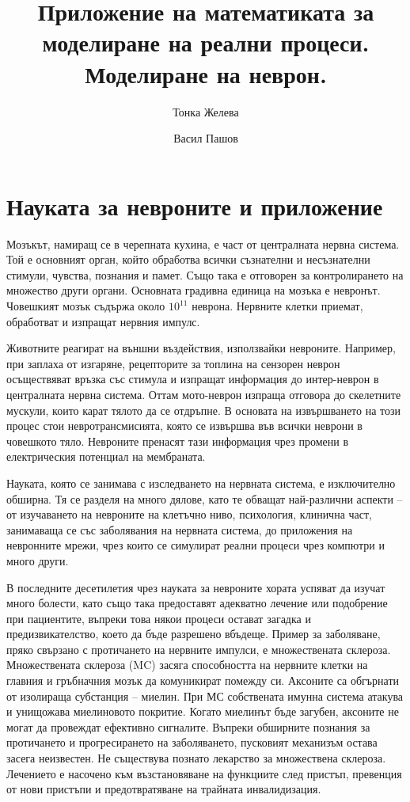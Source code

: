 \documentclass{article}
\title{Приложение на математиката за моделиране на реални процеси. Моделиране на неврон.}
\author{Тонка Желева \and Васил Пашов}
\begin{document}
\maketitle
\newpage

\tableofcontents
\newpage

\section{Науката за невроните и приложение}

Мозъкът, намиращ се в черепната кухина, е част от централната нервна система. Той е основният орган, който обработва всички съзнателни и
несъзнателни стимули, чувства,  познания и памет. Също така е отговорен за контролирането на множество други органи. Основната градивна
единица на мозъка е невронът. Човешкият мозък съдържа около $10^{11}$ неврона. Нервните клетки приемат, обработват и изпращат нервния импулс.

Животните реагират на външни въздействия, използвайки невроните.  Например, при заплаха от изгаряне, рецепторите за топлина на сензорен
неврон осъществяват връзка със стимула и изпращат информация до интер-неврон в централната нервна система. Оттам мото-неврон изпраща
отговора до скелетните мускули, които карат тялото да се отдръпне. В основата на извършването на този процес стои невротрансмисията, която
се извършва във всички неврони в човешкото тяло. Невроните пренасят тази информация чрез промени в електрическия потенциал на мембраната.

Науката, която се занимава с изследването на нервната система, е изключително обширна. Тя се разделя на много дялове, като те обващат най-различни аспекти -- от изучаването на невроните на клетъчно ниво, психология, клинична част, занимаваща се със заболявания на нервната система, до приложения на невронните мрежи, чрез които се симулират реални процеси чрез компютри и много други.

В последните десетилетия чрез науката за невроните хората успяват да изучат много болести, като също така предоставят адекватно лечение или подобрение при пациентите, въпреки това някои процеси остават загадка и предизвикателство, което да бъде разрешено вбъдеще. Пример за заболяване, пряко свързано с протичането на нервните импулси, е множествената склероза. Множествената склероза (MC) засяга способността на нервните клетки на главния и гръбначния мозък да комуникират помежду си. Аксоните са обгърнати от изолираща субстанция – миелин. При МС собствената имунна система атакува и унищожава миелиновото покритие. Когато миелинът бъде загубен, аксоните не могат да провеждат ефективно сигналите. Въпреки обширните познания за протичането и прогресирането на заболяването, пусковият механизъм остава засега неизвестен. Не съществува познато лекарство за множествена склероза. Лечението е насочено към възстановяване на функциите след пристъп, превенция от нови пристъпи и предотвратяване на трайната инвалидизация.
\end{document}

